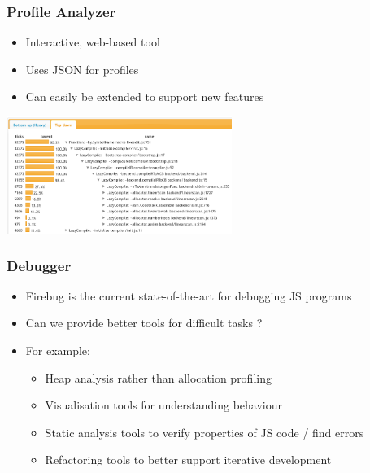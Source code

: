 \begin{frame}
\frametitle{\bf Profile Analyzer}

    \begin{itemize}
        \item Interactive, web-based tool
        \item Uses JSON for profiles
        \item Can easily be extended to support new features
    \end{itemize}

    \begin{center}
        \includegraphics[height=1.5in]{images/prof-topdown.png}
    \end{center}
\end{frame}

\begin{frame}
\frametitle{\bf Debugger}
    \begin{itemize}
        \item Firebug is the current state-of-the-art for debugging JS programs
        \item Can we provide better tools for difficult tasks ?
        \item For example: 
        \begin{itemize}
            \item Heap analysis rather than allocation profiling
            \item Visualisation tools for understanding behaviour
            \item Static analysis tools to verify properties of JS code / find
            errors
            \item Refactoring tools to better support iterative development
        \end{itemize}
    \end{itemize}
\end{frame}

